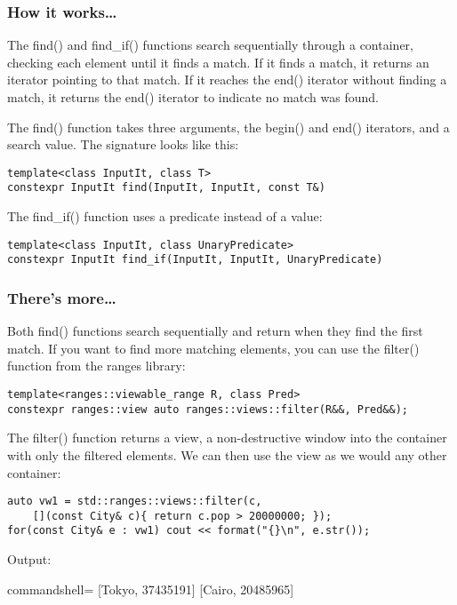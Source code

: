 \subsubsection{How it works…}

The find() and find\_if() functions search sequentially through a container, checking each element until it finds a match. If it finds a match, it returns an iterator pointing to that match. If it reaches the end() iterator without finding a match, it returns the end() iterator to indicate no match was found.

The find() function takes three arguments, the begin() and end() iterators, and a search value. The signature looks like this:

\begin{lstlisting}[style=styleCXX]
template<class InputIt, class T>
constexpr InputIt find(InputIt, InputIt, const T&)
\end{lstlisting}

The find\_if() function uses a predicate instead of a value:

\begin{lstlisting}[style=styleCXX]
template<class InputIt, class UnaryPredicate>
constexpr InputIt find_if(InputIt, InputIt, UnaryPredicate)
\end{lstlisting}


\subsubsection{There's more…}

Both find() functions search sequentially and return when they find the first match. If you want to find more matching elements, you can use the filter() function from the ranges library:

\begin{lstlisting}[style=styleCXX]
template<ranges::viewable_range R, class Pred>
constexpr ranges::view auto ranges::views::filter(R&&, Pred&&);
\end{lstlisting}

The filter() function returns a view, a non-destructive window into the container with only the filtered elements. We can then use the view as we would any other container:

\begin{lstlisting}[style=styleCXX]
auto vw1 = std::ranges::views::filter(c,
	[](const City& c){ return c.pop > 20000000; });
for(const City& e : vw1) cout << format("{}\n", e.str());
\end{lstlisting}

Output:

\begin{tcblisting}{commandshell={}}
[Tokyo, 37435191]
[Cairo, 20485965]
\end{tcblisting}
